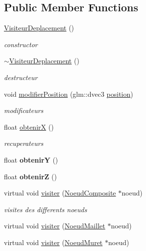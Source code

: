 \subsection*{Public Member Functions}
\begin{DoxyCompactItemize}
\item 
\hyperlink{group__inf2990_ga96164e1d4e72549c09424358e8f01e78}{Visiteur\+Deplacement} ()
\begin{DoxyCompactList}\small\item\em constructor \end{DoxyCompactList}\item 
\hyperlink{group__inf2990_ga0f03274d6afe77a7a57f3b7f20417ec8}{$\sim$\+Visiteur\+Deplacement} ()
\begin{DoxyCompactList}\small\item\em destructeur \end{DoxyCompactList}\item 
void \hyperlink{group__inf2990_ga882cdd41499aab95ccc1eecbafebbb09}{modifier\+Position} (glm\+::dvec3 \hyperlink{structposition}{position})
\begin{DoxyCompactList}\small\item\em modificateurs \end{DoxyCompactList}\item 
float \hyperlink{group__inf2990_ga1be5d6505e3355287b55d5fbe448e600}{obtenirX} ()
\begin{DoxyCompactList}\small\item\em recuperateurs \end{DoxyCompactList}\item 
float {\bfseries obtenirY} ()
\item 
float {\bfseries obtenirZ} ()
\item 
virtual void \hyperlink{group__inf2990_ga2d81940a4fd36b6c5ea00ef022191dc8}{visiter} (\hyperlink{class_noeud_composite}{Noeud\+Composite} $\ast$noeud)
\begin{DoxyCompactList}\small\item\em visites des differents noeuds \end{DoxyCompactList}\item 
virtual void \hyperlink{group__inf2990_gac3e9945e0d76cd90f7f7722fccd74298}{visiter} (\hyperlink{class_noeud_maillet}{Noeud\+Maillet} $\ast$noeud)
\item 
virtual void \hyperlink{group__inf2990_ga2c4d7672f376bd635318a0e987e696ed}{visiter} (\hyperlink{class_noeud_muret}{Noeud\+Muret} $\ast$noeud)
\item 

\end{DoxyCompactItemize}
